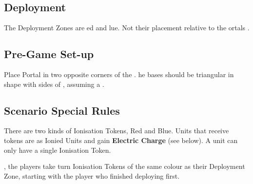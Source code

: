 
\label{GreatPortalsoftheBarrenMountains}


\subsection*{Deployment}

The Deployment Zones are  ed and lue. Not their placement relative to the ortals . 

\newcommand{\reddeploymentzone}{Red Deployment Zone}
\newcommand{\bluedeploymentzone}{Blue Deployment Zone}


\subsection*{Pre-Game Set-up}

Place  Portal in two  opposite corners of the . he bases should be triangular in shape with sides of , assuming a  .

\subsection*{Scenario Special Rules}

There are two kinds of Ionisation Tokens, Red and Blue. Units that receive tokens are  as Ionied Units and gain \textbf{Electric Charge} (see below). A unit can only have a single Ionisation Token.

, the players take turn Ionisation Tokens of the same colour as their Deployment Zone, starting with the player who finished deploying first.

